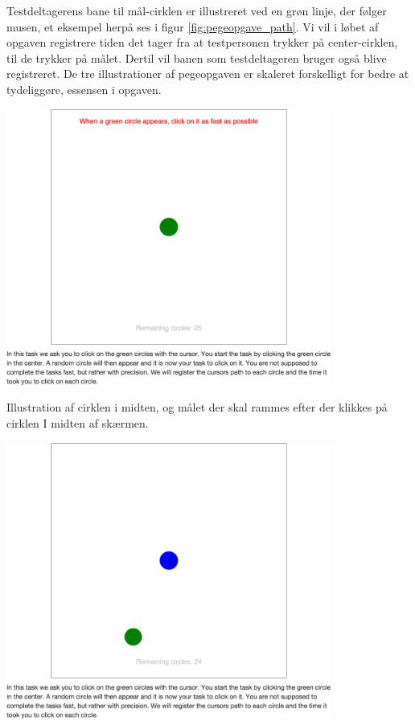 Testdeltagerens bane til mål-cirklen er illustreret ved en grøn linje, der følger musen, et eksempel herpå ses i figur \ref{fig:pegeopgave_path}. Vi vil i løbet af opgaven registrere tiden det tager fra at testpersonen trykker på center-cirklen, til de trykker på målet. Dertil vil banen som testdeltageren bruger også blive registreret. De tre illustrationer af pegeopgaven er skaleret forskelligt for bedre at tydeliggøre, essensen i opgaven.

\begin{minipage}[t]{.5\linewidth}
\centering
\vspace{0pt}
\includegraphics[width=0.8\textwidth, trim = 8cm 20cm 8cm 15cm, clip]{images/screenshots/ex_step_6_pointing_start}
\label{fig:pegeopgave_start}
\caption{Illustration af cirklen i midten, og målet der skal rammes efter der klikkes på cirklen I midten af skærmen.}
\includegraphics[width=0.8\textwidth, trim = 8cm 8cm 8cm 15cm, clip]{images/screenshots/ex_step_6_pointing_target_1}

\end{minipage}
